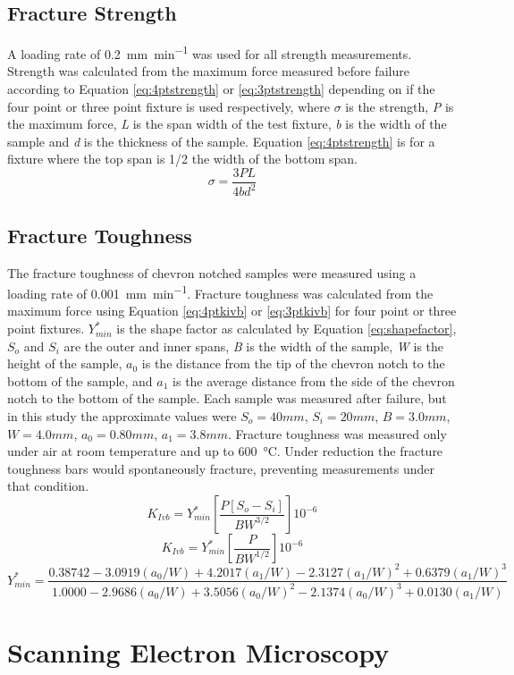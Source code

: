     \subsection{Fracture Strength}
        A loading rate of \SI{0.2}{mm\per\minute} was used for all strength measurements.
        Strength was calculated from the maximum force measured before failure according to Equation \ref{eq:4ptstrength} or \ref{eq:3ptstrength} depending on if the four point or three point fixture is used respectively, where $\sigma{}$ is the strength, \textit{P} is the maximum force, \textit{L} is the span width of the test fixture, \textit{b} is the width of the sample and \textit{d} is the thickness of the sample. Equation \ref{eq:4ptstrength} is for a fixture where the top span is 1/2 the width of the bottom span.\cite{ASTM2008}
        \begin{equation}
            \sigma = \frac{3PL}{4bd^{2}}
            \label{eq:4ptstrength}
        \end{equation}

    \subsection{Fracture Toughness}
        The fracture toughness of chevron notched samples were measured using a loading rate of \SI{0.001}{mm\per\minute}.
        Fracture toughness was calculated from the maximum force using Equation \ref{eq:4ptkivb} or \ref{eq:3ptkivb} for four point or three point fixtures.\cite{ASTM2016a,Wu1984}
        $Y^{*}_{min}$ is the shape factor as calculated by Equation \ref{eq:shapefactor}, $S_o$ and $S_i$ are the outer and inner spans, \textit{B} is the width of the sample, \textit{W} is the height of the sample, $a_0$ is the distance from the tip of the chevron notch to the bottom of the sample, and $a_1$ is the average distance from the side of the chevron notch to the bottom of the sample.
        Each sample was measured after failure, but in this study the approximate values were $S_o = 40 mm$, $S_i = 20 mm$, $B = 3.0 mm$, $W = 4.0 mm$, $a_0 = 0.80 mm$, $a_1 = 3.8 mm$.
        Fracture toughness was measured only under air at room temperature and up to \SI{600}{\celsius}.
        Under reduction the fracture toughness bars would spontaneously fracture, preventing measurements under that condition.
        \begin{equation}
            K_{Ivb} = Y^{*}_{min}  \left [\frac{P[S_o-S_i]}{BW^{3/2}}\right ]10^{-6}
            \label{eq:4ptkivb}
        \end{equation}
        \begin{equation}
            K_{Ivb} = Y^{*}_{min}  \left [\frac{P}{BW^{1/2}}\right ]10^{-6}
            \label{eq:3ptkivb}
        \end{equation}
        \begin{equation}
            Y^{*}_{min} = \frac{0.38742-3.0919(a_0/W)+4.2017(a_1/W)-2.3127(a_1/W)^2+0.6379(a_1/W)^3}{1.0000-2.9686(a_0/W)+3.5056(a_0/W)^2-2.1374(a_0/W)^3+0.0130(a_1/W)}
            \label{eq:shapefactor}
        \end{equation}

    \section{Scanning Electron Microscopy}
